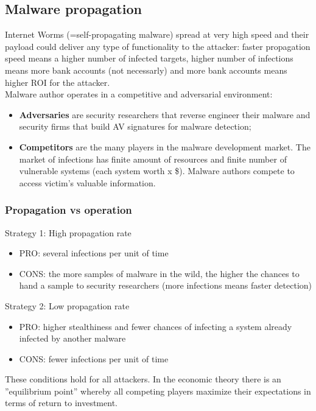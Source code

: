 \documentclass[a4paper, 10pt, titlepage]{article}
\begin{document}
\subsection{Malware propagation}
Internet Worms (=self-propagating malware) spread at very high speed and their payload could deliver any type of functionality to the attacker: faster propagation speed means a higher number of infected targets, higher number of infections means more bank accounts (not necessarly) and more bank accounts means higher ROI for the attacker. \\
Malware author operates in a competitive and adversarial environment:
\begin{itemize}
	\item \textbf{Adversaries} are security researchers that reverse engineer their malware and security firms that build AV signatures for malware detection;
	\item \textbf{Competitors} are the many players in the malware development market. The market of infections has finite amount of resources and finite number of vulnerable systems (each system worth x \$). Malware authors compete to access victim’s valuable information.
\end{itemize}

\subsubsection*{Propagation vs operation}
Strategy 1: High propagation rate
\begin{itemize}
	\item PRO: several infections per unit of time
	\item CONS: the more samples of malware in the wild, the higher the
	chances to hand a sample to security researchers (more infections means faster detection)
\end{itemize}
Strategy 2: Low propagation rate
\begin{itemize}
	\item PRO: higher stealthiness and fewer chances of infecting a system already infected by another malware
	\item CONS: fewer infections per unit of time
\end{itemize}
These conditions hold for all attackers. In the economic theory there is an ”equilibrium point” whereby all competing players maximize their expectations in terms of return to investment.
\end{document}
